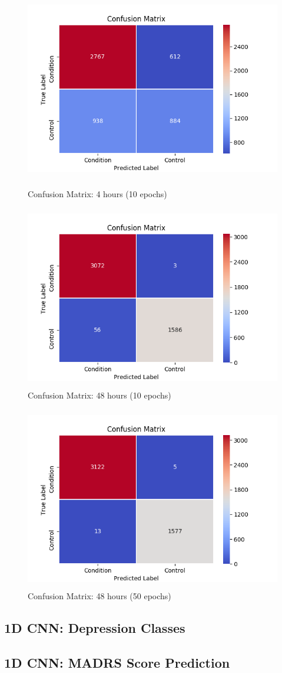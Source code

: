 \begin{figure}
      \includegraphics[height=8cm]{img/control_condition/conf_240_60_10_32.png}
      \caption{Confusion Matrix: 4 hours (10 epochs)}
      \label{figure:control_condition_confusion_matrix_4h}

      \includegraphics[height=8cm]{img/control_condition/conf_2880_60_10_32.png}
      \caption{Confusion Matrix: 48 hours (10 epochs)}
      \label{figure:control_condition_confusion_matrix_48h}
\end{figure}

\begin{figure}
      \includegraphics[height=8cm]{img/control_condition/conf_2880_60_50_32.png}
      \caption{Confusion Matrix: 48 hours (50 epochs)}
      \label{figure:control_condition_confusion_matrix_48h_50e}
\end{figure}

\subsection{1D CNN: Depression Classes}




\subsection{1D CNN: MADRS Score Prediction}